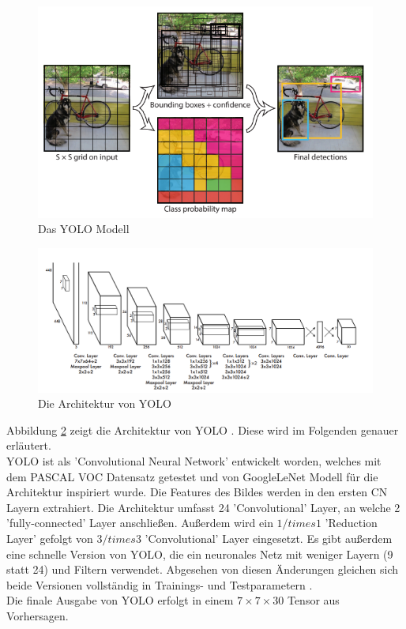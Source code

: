 {{	\begin{figure}[ht]
		\centering
		\includegraphics*[scale = 2, keepaspectratio, trim=2 2 2 2 ]{images/YOLO/YOLO_model.png}
		\caption[Das YOLO Modell]{Das YOLO Modell\citep{Plastiras2018}}
		\label{YOLO_Model}
 	\end{figure}

	 \begin{figure}[h]
		\centering
		\includegraphics*[scale = 1.5, keepaspectratio]{images/YOLO/YOLO_network_arch.png}
		\caption[Die Architektur von YOLO]{Die Architektur von YOLO\citep{Plastiras2018}}
		\label{YOLO_Architecture}
 	\end{figure}

	Abbildung \ref{YOLO_Architecture} zeigt die Architektur von YOLO \citep{Plastiras2018}. Diese wird im Folgenden genauer erläutert. \\
	YOLO ist als 'Convolutional Neural Network' entwickelt worden, welches mit dem PASCAL VOC Datensatz getestet und von GoogleLeNet Modell für die Architektur inspiriert wurde. Die Features des Bildes werden in den ersten CN Layern extrahiert. Die Architektur umfasst 24 'Convolutional' Layer, an welche 2 'fully-connected' Layer anschließen. Außerdem wird ein $1 /times 1$ 'Reduction Layer' gefolgt von $3 /times 3$ 'Convolutional' Layer eingesetzt. Es gibt außerdem eine schnelle Version von YOLO, die ein neuronales Netz mit weniger Layern (9 statt 24) und Filtern verwendet. Abgesehen von diesen Änderungen gleichen sich beide Versionen vollständig in Trainings- und Testparametern \citep{Plastiras2018}. \\
	Die finale Ausgabe von YOLO erfolgt in einem $7 \times 7 \times 30$ Tensor aus Vorhersagen. \\

}}
